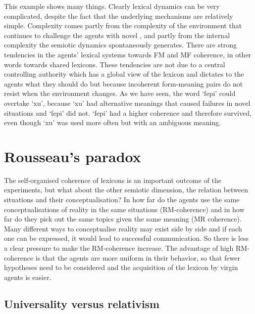 This example shows many things. Clearly
lexical dynamics can be very complicated, despite the 
fact that the underlying mechanisms are relatively 
simple. Complexity comes partly from the complexity of
the environment that continues to challenge the agents
with novel , and partly from the internal 
complexity the semiotic dynamics spontaneously generates. 
There are strong tendencies in the agents' lexical systems
towards FM and MF coherence, 
in other words towards shared lexicons. These tendencies
are not due to a central controlling authority which 
has a global view of the lexicon and dictates to the 
agents what they should do but because incoherent 
form-meaning pairs do not resist when the environment 
changes. As we have seen, the word `fepi' could 
overtake `xu', because `xu' had alternative meanings that 
caused failures in novel situations and `fepi' did not. 
`fepi' had a higher coherence and therefore survived, even
though `xu' was used more often but with an 
ambiguous meaning. 

\section{Rousseau's paradox}

The self-organised coherence of lexicons is an important
outcome of the experiments, but what about the other
semiotic dimension, the relation
between situations and their conceptualisation? 
In how far do the agents use the same 
conceptualisations of reality in the same situations
(RM-coherence) and in how far do they pick out the same topics
given the same meaning (MR coherence). Many different ways
to conceptualise reality may exist side by side and if
each one can be expressed, it would lead to successful
communication. So there is 
less a clear pressure to make the RM-coherence increase. 
The advantage of high RM-coherence is that the agents 
are more uniform in their behavior, so that fewer 
hypotheses need to be considered and the acquisition of 
the lexicon by virgin agents is easier. 

\subsection{Universality versus relativism}

